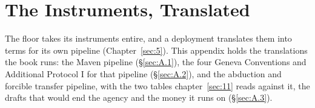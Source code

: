 \chapter{The Instruments, Translated}
\label{sec:A}
The floor takes its instruments entire, and a deployment translates them into terms for its own pipeline (Chapter~\ref{sec:5}). This appendix holds the translations the book runs: the Maven pipeline (\S\ref{sec:A.1}), the four Geneva Conventions and Additional Protocol I for that pipeline (\S\ref{sec:A.2}), and the abduction and forcible transfer pipeline, with the two tables chapter~\ref{sec:11} reads against it, the drafts that would end the agency and the money it runs on (\S\ref{sec:A.3}).
